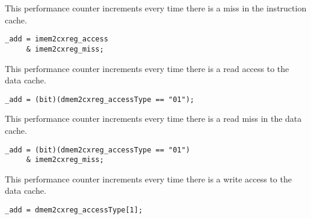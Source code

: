 
This performance counter increments every time there is a miss in the 
instruction cache.

\implementation{}
\begin{lstlisting}
_add = imem2cxreg_access
     & imem2cxreg_miss;
\end{lstlisting}


This performance counter increments every time there is a read access to the 
data cache.

\implementation{}
\begin{lstlisting}
_add = (bit)(dmem2cxreg_accessType == "01");
\end{lstlisting}


This performance counter increments every time there is a read miss in the data 
cache.

\implementation{}
\begin{lstlisting}
_add = (bit)(dmem2cxreg_accessType == "01")
     & imem2cxreg_miss;
\end{lstlisting}


This performance counter increments every time there is a write access to the 
data cache.

\implementation{}
\begin{lstlisting}
_add = dmem2cxreg_accessType[1];
\end{lstlisting}

